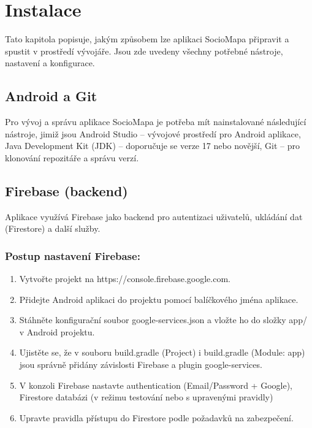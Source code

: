 \chapter{Instalace}

Tato kapitola popisuje, jakým způsobem lze aplikaci SocioMapa připravit a spustit v prostředí vývojáře. Jsou zde uvedeny všechny potřebné nástroje, nastavení a konfigurace.

\section{Android a Git}

Pro vývoj a správu aplikace SocioMapa je potřeba mít nainstalované následující nástroje, jimiž jsou Android Studio – vývojové prostředí pro Android aplikace, Java Development Kit (JDK) – doporučuje se verze 17 nebo novější, Git – pro klonování repozitáře a správu verzí.


\section{Firebase (backend)}

Aplikace využívá Firebase jako backend pro autentizaci uživatelů, ukládání dat (Firestore) a další služby.

\subsection*{Postup nastavení Firebase:}
\begin{enumerate}
	\item Vytvořte projekt na https://console.firebase.google.com.
	\item Přidejte Android aplikaci do projektu pomocí balíčkového jména aplikace.
	\item Stáhněte konfigurační soubor google-services.json a vložte ho do složky app/ v Android projektu.
	\item Ujistěte se, že v souboru build.gradle (Project) i build.gradle (Module: app) jsou správně přidány závislosti Firebase a plugin google-services.
	\item V konzoli Firebase nastavte authentication (Email/Password + Google), Firestore databázi (v režimu testování nebo s upravenými pravidly)
	\item Upravte pravidla přístupu do Firestore podle požadavků na zabezpečení.
\end{enumerate}



